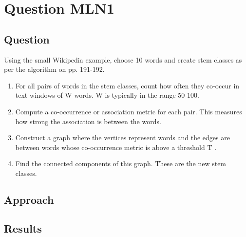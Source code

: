 \section{Question MLN1}

\subsection{Question}
Using the small Wikipedia example, choose 10 words and create stem classes as per the algorithm on pp. 191-192.

\begin{enumerate}
    \item For all pairs of words in the stem classes, count how often they co-occur in text windows of W words. W is typically in the range 50-100.
    \item Compute a co-occurrence or association metric for each pair. This measures how strong the association is between the words.
    \item Construct a graph where the vertices represent words and the edges are between words whose co-occurrence metric is above a threshold T .
    \item Find the connected components of this graph. These are the new stem classes.
\end{enumerate}

\subsection{Approach}



\subsection{Results}

